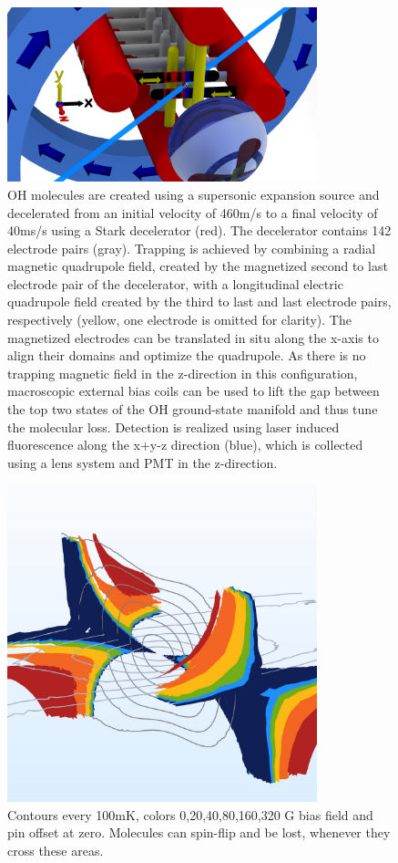 \documentclass[%
 reprint,
 amsmath,amssymb,
 aps,
prl,
]{revtex4-1}
\begin{document}
\begin{figure}[b]
\includegraphics[width=90mm]{blue-red-yellow-v2_CAD.png}%
\caption{
OH molecules are created using a supersonic expansion source and decelerated from an initial velocity of 460m/s to a final velocity of 40ms/s using a Stark decelerator (red). The decelerator contains 142 electrode pairs (gray). Trapping is achieved by combining a radial magnetic quadrupole field, created by the magnetized second to last electrode pair of the decelerator, with a longitudinal electric quadrupole field created by the third to last and last electrode pairs, respectively (yellow, one electrode is omitted for clarity). The magnetized electrodes can be translated in situ along the x-axis to align their domains and optimize the quadrupole. As there is no trapping magnetic field in the z-direction in this configuration, macroscopic external bias coils can be used to lift the gap between the top two states of the OH ground-state manifold and thus tune the molecular loss. Detection is realized using laser induced fluorescence along the x+y-z direction (blue), which is collected using a lens system and PMT in the z-direction.
\label{fig:CAD}}
\end{figure}


\begin{figure}[b]
\includegraphics[width=90mm]{Loss_Surface_Chunks_0-320_0.jpeg}%
\caption{
Contours every 100mK, colors 0,20,40,80,160,320 G bias field and pin offset at zero. Molecules can spin-flip and be lost, whenever they cross these areas.
\label{fig:LSurfs}}
\end{figure}
\end{document}
